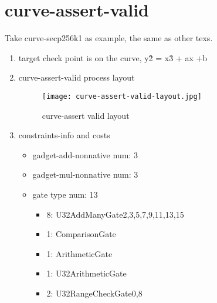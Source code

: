 \section{curve-assert-valid}
\label{curve-assert-valid}

Take curve-secp256k1 as example, the same as other texs.

\begin{enumerate}
    \item target
        check point is on the curve, y\^2 = x\^3 + ax +b
    \item curve-assert-valid process layout
        \begin{figure}[!ht]
            \centering
            \texttt{[image: curve-assert-valid-layout.jpg]}
            \caption{curve-assert valid layout}
            \label{fig:curve-assert-valid-layout}
        \end{figure}
    \item constraints-info and costs
        \begin{itemize}
            \item gadget-add-nonnative num: 3
            \item gadget-mul-nonnative num: 3
            \item gate type num: 13
                \begin{itemize}
                    \item 8: U32AddManyGate{2,3,5,7,9,11,13,15}
                    \item 1: ComparisonGate
                    \item 1: ArithmeticGate
                    \item 1: U32ArithmeticGate
                    \item 2: U32RangeCheckGate{0,8}
                \end{itemize}
        \end{itemize}

\end{enumerate}